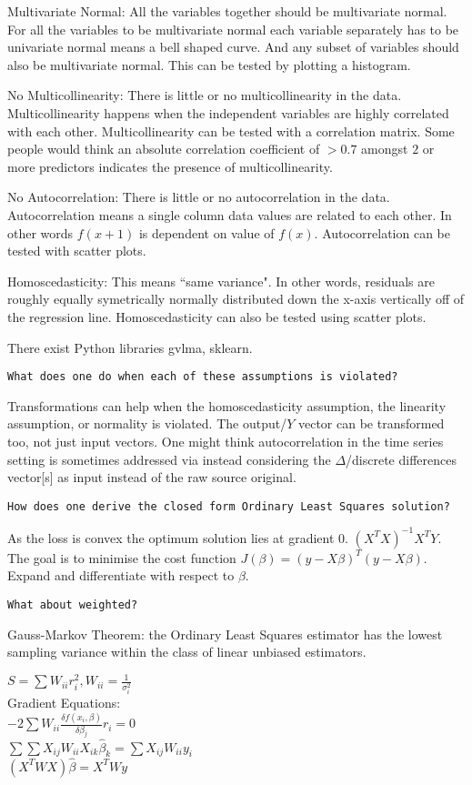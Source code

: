 Multivariate Normal: All the variables together should be multivariate normal. For all the variables to be multivariate normal each variable separately has to be univariate normal means a bell shaped curve. And any subset of variables should also be multivariate normal. This can be tested by plotting a histogram.

No Multicollinearity: There is little or no multicollinearity in the data. Multicollinearity happens when the independent variables are highly correlated with each other. Multicollinearity can be tested with a correlation matrix. Some people would think an absolute correlation coefficient of $>0.7$ amongst $2$ or more predictors indicates the presence of multicollinearity.

No Autocorrelation: There is little or no autocorrelation in the data. Autocorrelation means a single column data values are related to each other. In other words $f(x+1)$ is dependent on value of $f(x)$. Autocorrelation can be tested with scatter plots.

Homoscedasticity: This means ``same variance". In other words, residuals are roughly equally symetrically normally distributed down the x-axis vertically off of the regression line. Homoscedasticity can also be tested using scatter plots.

There exist Python libraries gvlma, sklearn.

\texttt{What does one do when each of these assumptions is violated?}

Transformations can help when the homoscedasticity assumption, the linearity assumption, or normality is violated. The output/$Y$ vector can be transformed too, not just input vectors. One might think autocorrelation in the time series setting is sometimes addressed via instead considering the $\Delta$/discrete differences vector[s] as input instead of the raw source original.

\texttt{How does one derive the closed form Ordinary Least Squares solution?}

As the loss is convex the optimum solution lies at gradient $0$. $(X^T X)^{-1} X^T Y$. The goal is to minimise the cost function $J(\beta)=(y-X \beta)^T (y-X \beta)$. Expand and differentiate with respect to $\beta$.

\texttt{What about weighted?}

Gauss-Markov Theorem: the Ordinary Least Squares estimator has the lowest sampling variance within the class of linear unbiased estimators.

$S=\sum W_{ii}r_i^2, W_{ii}=\frac{1}{\sigma_i^2}$ \\
Gradient Equations: \\
$-2\sum W_{ii} \frac{\delta f(x_i,\beta)}{\delta \beta_j} r_i=0$ \\
$\sum \sum X_{ij}W_{ii}X_{ik}\hat{\beta}_k = \sum X_{ij} W_{ii} y_i$ \\
$(X^T W X)\hat{\beta}=X^T W y$

